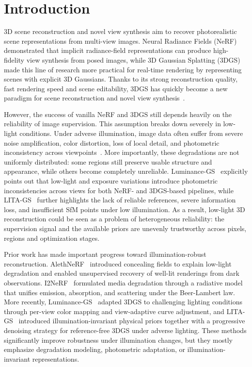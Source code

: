 \section{Introduction}
\label{sec:intro}

3D scene reconstruction and novel view synthesis aim to recover
photorealistic scene representations from multi-view images. Neural Radiance
Fields (NeRF)~\cite{nerf} demonstrated that implicit radiance-field
representations can produce high-fidelity view synthesis from posed images,
while 3D Gaussian Splatting (3DGS)~\cite{kerbl20233d} made this line of
research more practical for real-time rendering by representing scenes with
explicit 3D Gaussians. Thanks to its strong reconstruction quality, fast
rendering speed and scene editability, 3DGS has quickly become a new paradigm
for scene reconstruction and novel view synthesis~\cite{survey3dgs}.

However, the success of vanilla NeRF and 3DGS still depends heavily on the
reliability of image supervision. This assumption breaks down severely in
low-light conditions. Under adverse illumination, image data often suffer
from severe noise amplification, color distortion, loss of local detail, and
photometric inconsistency across viewpoints~\cite{liu2025realx3d,zhou2025lita}.
More importantly, these degradations are not uniformly distributed: some
regions still preserve usable structure and appearance, while others become
completely unreliable. Luminance-GS~\cite{cui2025luminance} explicitly points
out that low-light and exposure variations introduce photometric
inconsistencies across views for both NeRF- and 3DGS-based pipelines, while
LITA-GS~\cite{zhou2025lita} further highlights the lack of reliable
references, severe information loss, and insufficient SfM points under low
illumination. As a result, low-light 3D reconstruction could be seen as a
problem of heterogeneous reliability: the supervision signal and the
available priors are unevenly trustworthy across pixels, regions and
optimization stages.

Prior work has made important progress toward illumination-robust
reconstruction. AlethNeRF~\cite{cui2024aleth} introduced concealing fields to
explain low-light degradation and enabled unsupervised recovery of well-lit
renderings from dark observations. I2NeRF~\cite{liu2025i2nerf} formulated
media degradation through a radiative model that unifies emission,
absorption, and scattering under the Beer-Lambert law. More recently,
Luminance-GS~\cite{cui2025luminance} adapted 3DGS to challenging lighting
conditions through per-view color mapping and view-adaptive curve adjustment,
and LITA-GS~\cite{zhou2025lita} introduced illumination-invariant physical
priors together with a progressive denoising strategy for reference-free
3DGS under adverse lighting. These methods significantly improve robustness
under illumination changes, but they mostly emphasize degradation modeling,
photometric adaptation, or illumination-invariant representations.

